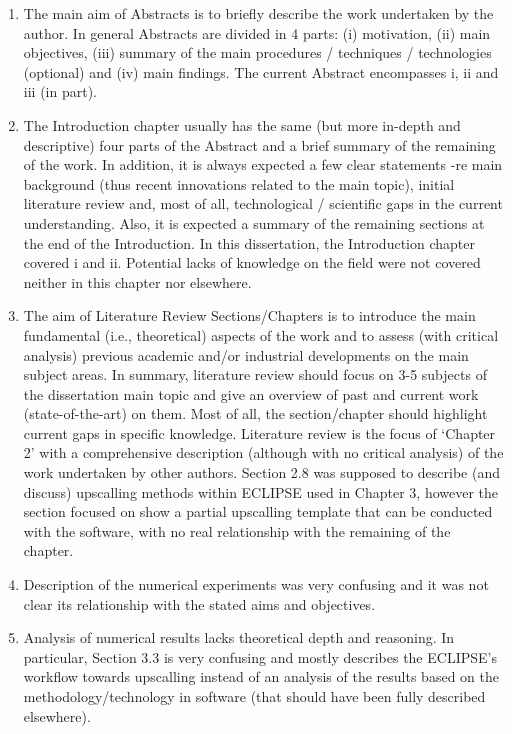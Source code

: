 \documentclass[14pt,twoside]{report}
\begin{document}
\begin{enumerate}
\begin{description}
                \begin{enumerate}
                   \item The main aim of Abstracts is to briefly describe the work undertaken by the author. In general Abstracts are divided in 4 parts: (i) motivation, (ii) main objectives, (iii) summary of the main procedures / techniques / technologies (optional) and (iv) main findings. The current Abstract encompasses i, ii and iii (in part).
                   \item The Introduction chapter usually has the same (but more in-depth and descriptive) four parts of the Abstract and a brief summary of the remaining of the work. In addition, it is always expected a few clear statements -re main background (thus recent innovations related to the main topic), initial literature review and, most of all, technological / scientific gaps in the current understanding. Also, it is expected a summary of the remaining sections at the end of the Introduction. In this dissertation, the Introduction chapter covered i and ii.  Potential lacks of knowledge on the field were not covered neither in this chapter nor elsewhere. 
                   \item The aim of Literature Review Sections/Chapters is to introduce the main fundamental (i.e., theoretical) aspects of the work and to assess (with critical analysis) previous academic and/or industrial developments on the main subject areas. In summary, literature review should focus on 3-5 subjects of the dissertation main topic and give an overview of past and current work (state-of-the-art) on them. Most of all, the section/chapter should highlight current gaps in specific knowledge. Literature review is the focus of `Chapter 2' with a comprehensive description (although with no critical analysis) of the work undertaken by other authors. Section 2.8 was supposed to describe (and discuss) upscalling methods within ECLIPSE used in Chapter 3, however the section focused on show a partial upscalling template that can be conducted with the software, with no real relationship with the remaining of the chapter.
                   \item Description of the numerical experiments was very confusing and it was not clear its relationship with the stated aims and objectives.
                   \item Analysis of numerical results lacks theoretical depth and reasoning. In particular, Section 3.3 is very confusing and mostly describes the ECLIPSE's workflow towards upscalling instead of an analysis of the results based on the methodology/technology in software (that should have been fully described elsewhere).

\end{enumerate}
\end{description}
\end{enumerate}
\end{document}
